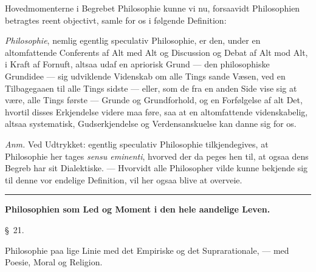 \documentclass[12pt,a4paper]{book}
\newcommand{\grouphead}[1]{%
  \bigskip\begin{center}\large\textbf{#1}\end{center}\smallskip}
\newcommand{\apage}[1]{\marginnote{\footnotesize\textit{[#1]}}}
\begin{document}
Hovedmomenterne i Begrebet Philosophie kunne vi nu, forsaavidt Philosophien
betragtes reent objectivt, samle for os i følgende Definition:

\emph{Philosophie}, nemlig egentlig speculativ Philosophie, er den, under en
altomfattende Conferents af Alt med Alt og Discussion og Debat af Alt mod Alt, i
Kraft af Fornuft, altsaa udaf en apriorisk Grund --- den philosophiske Grundidee ---
sig udviklende Videnskab om alle Tings sande Væsen, ved en Tilbagegaaen til alle
Tings sidste --- eller, som de fra en anden Side vise sig at være, alle Tings første
--- Grunde og Grundforhold, og en Forfølgelse af alt Det, hvortil disses Erkjendelse
videre maa føre, saa at en altomfattende videnskabelig, altsaa systematisk,
Gudserkjendelse og Verdensanskuelse kan danne sig for os.

{\small\emph{Anm.} Ved Udtrykket: egentlig speculativ Philosophie tilkjendegives, at
Philosophie her tages \textit{sensu eminenti}, hvorved der da peges hen til, at ogsaa
dens Begreb har sit Dialektiske. --- Hvorvidt alle Philosopher vilde kunne bekjende
sig til denne vor endelige Definition, vil her ogsaa blive at overveie.\par}

\begin{center}\rule{0.18\linewidth}{0.4pt}\end{center}

\grouphead{Philosophien som Led og Moment i den hele aandelige Leven.} \apage{82} 

\begin{center}\large\S~21.\end{center}
\begin{center}Philosophie paa lige Linie med det Empiriske og det Suprarationale,
--- med Poesie, Moral og Religion.\end{center}
\end{document}
